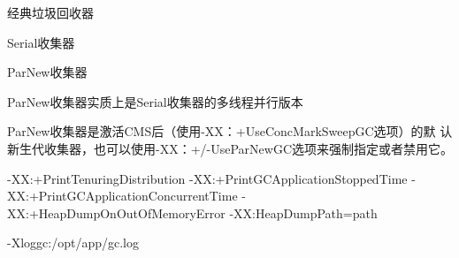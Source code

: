 经典垃圾回收器


Serial收集器

ParNew收集器


ParNew收集器实质上是Serial收集器的多线程并行版本

ParNew收集器是激活CMS后（使用-XX：+UseConcMarkSweepGC选项）的默 认新生代收集器，也可以使用-XX：+/-UseParNewGC选项来强制指定或者禁用它。



                

    
                               
                                
                                


-XX:+PrintTenuringDistribution
-XX:+PrintGCApplicationStoppedTime
-XX:+PrintGCApplicationConcurrentTime
-XX:+HeapDumpOnOutOfMemoryError
-XX:HeapDumpPath=path


-Xloggc:/opt/app/gc.log
